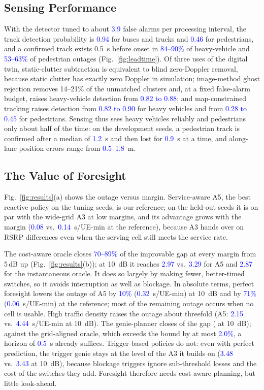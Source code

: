 \documentclass[conference]{IEEEtran}
\newcommand{\prelim}[1]{\textcolor{blue}{#1}}
\providecommand{\numBusPd}{\prelim{0.94}}
\providecommand{\numPedPd}{\prelim{0.46}}
\providecommand{\numFA}{\prelim{3.9}}
\providecommand{\numLeadBus}{\prelim{84--90\%}}
\providecommand{\numLeadPed}{\prelim{53--63\%}}
\providecommand{\numMapBus}{\prelim{0.82 to 0.90}}
\providecommand{\numMapPed}{\prelim{0.28 to 0.45}}
\providecommand{\numGhostGain}{\prelim{0.82 to 0.88}}
\providecommand{\numAthreeTen}{\prelim{3.43}}
\providecommand{\numAthreeWideRef}{\prelim{0.14}}
\providecommand{\numGenieTen}{\prelim{3.48}}
\providecommand{\numOracleTen}{\prelim{2.87}}
\providecommand{\numAfiveTen}{\prelim{3.29}}
\providecommand{\numAfiveRef}{\prelim{0.08}}
\providecommand{\numCostOracleTen}{\prelim{2.97}}
\providecommand{\numRelRedTen}{\prelim{10\%}}
\providecommand{\numCalPedAcq}{\prelim{1.2}}
\providecommand{\numCalPedOut}{\prelim{0.9}}
\providecommand{\numCalPosErr}{\prelim{0.5--1.8}}
\providecommand{\numGridCost}{\prelim{2.0\%}}
\providecommand{\numDensLowTen}{\prelim{2.15}}
\providecommand{\numDensHighTen}{\prelim{4.44}}
\providecommand{\numAbsRedTen}{\prelim{0.32}}
\providecommand{\numRelRedRef}{\prelim{71\%}}
\providecommand{\numAbsRedRef}{\prelim{0.06}}
\providecommand{\numValueRange}{\prelim{70--89\%}}
\providecommand{\numPlanHorizon}{\prelim{0.5}}
\begin{document}
\subsection{Sensing Performance}
With the detector tuned to about \numFA{} false alarms per processing
interval, the track detection probability is \numBusPd{} for buses and
trucks and \numPedPd{} for pedestrians, and a confirmed track exists
\SI{0.5}{s} before onset in \numLeadBus{} of heavy-vehicle and
\numLeadPed{} of pedestrian outages (Fig.~\ref{fig:leadtime}). Of three
uses of the digital twin, static-clutter subtraction is equivalent to
blind zero-Doppler removal, because static clutter has exactly zero
Doppler in simulation; image-method ghost rejection removes 14--21\% of
the unmatched clusters and, at a fixed false-alarm budget, raises
heavy-vehicle detection from \numGhostGain{}; and map-constrained
tracking raises detection from \numMapBus{} for heavy vehicles and from
\numMapPed{} for pedestrians. Sensing thus sees heavy vehicles reliably
and pedestrians only about half of the time: on the development seeds,
a pedestrian track is confirmed after a median of \numCalPedAcq~s and
then lost for \numCalPedOut~s at a time, and along-lane position errors
range from \numCalPosErr~m.

\subsection{The Value of Foresight}
Fig.~\ref{fig:results}(a) shows the outage versus margin. Service-aware
A5, the best reactive policy on the tuning seeds, is our reference; on
the held-out seeds it is on par with the wide-grid A3 at low margins,
and its advantage grows with the margin (\numAfiveRef{} vs.\
\numAthreeWideRef~s/UE-min at the reference), because A3 hands over on
RSRP differences even when the serving cell still meets the service rate.

The cost-aware oracle closes \numValueRange{} of the improvable gap at
every margin from 5\,dB up (Fig.~\ref{fig:results}(b)); at \SI{10}{dB} it
reaches \numCostOracleTen{} vs.\ \numAfiveTen{} for A5 and
\numOracleTen{} for the instantaneous oracle. It does so largely by
making fewer, better-timed switches, so it avoids interruption as well as
blockage. In absolute terms, perfect foresight lowers the outage of A5
by \numRelRedTen{} (\numAbsRedTen~s/UE-min) at \SI{10}{dB} and by
\numRelRedRef{} (\numAbsRedRef~s/UE-min) at the reference; most of the
remaining outage occurs when no cell is usable. High traffic density
raises the outage about threefold (A5: \numDensLowTen{} vs.\
\numDensHighTen~s/UE-min at \SI{10}{dB}). The genie-planner closes
\numGeniePlanShareRange{} of the gap (\numGeniePlanShareTen{} at
\SI{10}{dB}); against the grid-aligned oracle, which exceeds the bound by
at most \numGridCost, a horizon of \numPlanHorizon~s already suffices.
Trigger-based policies do not: even with perfect prediction, the trigger
genie stays at the level of the A3 it builds on (\numGenieTen{} vs.\
\numAthreeTen{} at \SI{10}{dB}), because blockage triggers ignore
sub-threshold losses and the cost of the switches they add. Foresight
therefore needs cost-aware planning, but little look-ahead.
\end{document}
